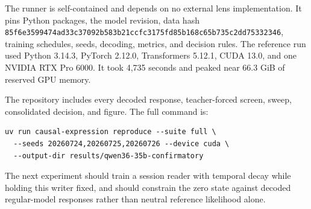 \documentclass[10pt]{article}
\newcommand{\code}[1]{\texttt{#1}}
\begin{document}
The runner is self-contained and depends on no external lens
implementation. It pins Python
packages, the model revision, data hash
\code{85f6e3599474ad33c37092b583b21ccfc3175fd85b168c65b735c2dd75332346},
training schedules, seeds, decoding, metrics, and decision rules. The reference
run used Python 3.14.3, PyTorch 2.12.0, Transformers 5.12.1, CUDA 13.0, and one
NVIDIA RTX Pro 6000. It took 4,735 seconds and peaked near 66.3 GiB of reserved
GPU memory.

The repository includes every decoded response, teacher-forced screen, sweep,
consolidated decision, and figure. The full command is:
\begin{verbatim}
uv run causal-expression reproduce --suite full \
  --seeds 20260724,20260725,20260726 --device cuda \
  --output-dir results/qwen36-35b-confirmatory
\end{verbatim}

The next experiment should train a session reader with temporal decay while
holding this writer fixed, and should constrain the zero state against decoded
regular-model responses rather than neutral reference likelihood alone.



\end{document}
